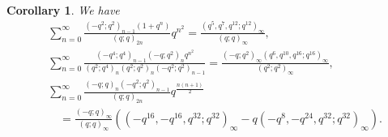 \documentclass[reqno,12pt]{amsart}
\newtheorem{corollary}[theorem]{Corollary}
\theoremstyle{remark}
\numberwithin{equation}{section}
\begin{document}
\begin{corollary}
We have
\begin{align}
&\sum_{n=0}^{\infty}\frac{\left(-q^2;q^2\right)_{n-1}\left(1+q^n\right)}
{\left(q;q\right)_{2n}}q^{n^2}
=\frac{\left(q^5,q^7,q^{12};q^{12}\right)_{\infty}}
{\left(q;q\right)_{\infty}},\tag{S.54} \label{S.54}\\
&\sum_{n=0}^{\infty}\frac{\left(-q^4;q^4\right)_{n-1}\left(-q;q^2\right)_nq^{n^2}}
{\left(q^2;q^4\right)_n\left(q^2;q^2\right)_n\left(-q^2;q^2\right)_{n-1}}
=
\frac{\left(-q;q^2\right)_{\infty}\left(q^6,q^{10},q^{16};q^{16}\right)_{\infty}}
{\left(q^2;q^2\right)_{\infty}},\tag{S.71}\label{S.71}\\
&\sum_{n=0}^{\infty}\frac{
\left(-q;q\right)_{n}\left(-q^2;q^2\right)_{n-1}
}{\left(q;q\right)_{2n}}q^{\frac{n\left(n+1\right)}{2}}
\nonumber\\
&\quad
=\frac{\left(-q;q\right)_{\infty}}
{\left(q;q\right)_{\infty}}\left(\left(-q^{16},-q^{16},q^{32};q^{32}\right)_{\infty}
-q\left(-q^{8},-q^{24},q^{32};q^{32}\right)_{\infty}\right).\tag{S.104} \label{S.104}
\end{align}
\end{corollary}
\end{document}
